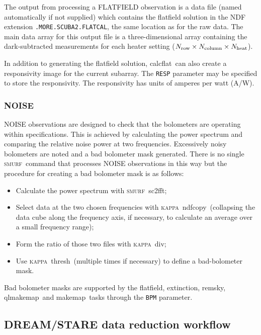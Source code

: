 \documentclass[twoside,11pt]{article}
\newcommand{\xref}[3]{#1}
\newcommand{\xlabel}[1]{}
\renewcommand{\_}{\texttt{\symbol{95}}}
\newcommand{\KAPPA}{\textsc{kappa}}
\newcommand{\SMURF}{\textsc{smurf}}
\newcommand{\task}[1]{\textsf{#1}}
\newcommand{\calcflat}{\xref{\task{calcflat}}{sun258}{CALCFLAT}}
\newcommand{\qlmakemap}{\xref{\task{qlmakemap}}{sun258}{QLMAKEMAP}}
\newcommand{\extinction}{\xref{\task{extinction}}{sun258}{EXTINCTION}}
\newcommand{\flatfield}{\xref{\task{flatfield}}{sun258}{FLATFIELD}}
\newcommand{\makemap}{\xref{\task{makemap}}{sun258}{MAKEMAP}}
\newcommand{\remsky}{\xref{\task{remsky}}{sun258}{REMSKY}}
\newcommand{\fft}{\xref{\task{sc2fft}}{sun258}{SC2FFT}}
\newcommand{\kapdiv}{\xref{\task{div}}{sun95}{DIV}}
\newcommand{\ndfcopy}{\xref{\task{ndfcopy}}{sun95}{NDFCOPY}}
\newcommand{\thresh}{\xref{\task{thresh}}{sun95}{THRESH}}
\newcommand{\aparam}[1]{\texttt{#1}}     %
\begin{document}
The output from processing a FLATFIELD observation is a data file
(named automatically if not supplied) which contains the flatfield
solution in the NDF extension \texttt{.MORE.SCUBA2.FLATCAL}, the same
location as for the raw data. The main data array for this output file
is a three-dimensional array containing the dark-subtracted
measurements for each heater setting ($N_{\rm row}\times N_{\rm
  column} \times N_{\rm heat}$).

In addition to generating the flatfield solution, \calcflat\ can also
create a responsivity image for the current subarray. The
\aparam{RESP} parameter may be specified to store the
responsivity. The responsivity has units of amperes per watt (A/W).

\subsubsection{NOISE}

NOISE observations are designed to check that the bolometers are
operating within specifications. This is achieved by calculating the
power spectrum and comparing the relative noise power at two
frequencies.  Excessively noisy bolometers are noted and a bad
bolometer mask generated. There is no single \SMURF\ command that
processes NOISE observations in this way but the procedure for
creating a bad bolometer mask is as follows:
\begin{itemize}
\item Calculate the power spectrum with \SMURF\ \fft;
\item Select data at the two chosen frequencies with \KAPPA\ \ndfcopy\
  (collapsing the data cube along the frequency axis, if necessary, to
  calculate an average over a small frequency range);
\item Form the ratio of those two files with \KAPPA\ \kapdiv;
\item Use \KAPPA\ \thresh\ (multiple times if necessary) to define a
  bad-bolometer mask.
\end{itemize}

Bad bolometer masks are supported by the \flatfield, \extinction,
\remsky, \qlmakemap\ and \makemap\ tasks through the \aparam{BPM}
parameter.

\subsection{\xlabel{dsworkflow}DREAM/STARE data reduction workflow\label{se:dsworkflow}}
\end{document}
